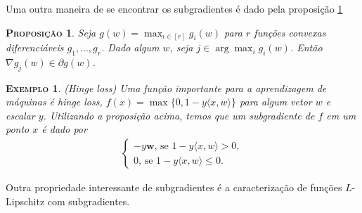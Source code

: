 \documentclass[
	12pt,				%
    oneside,			%
	a4paper,			%
	english,			%
	french,				%
	spanish,			%
	brazil,				%
	]{abntex2}
\newtheorem{propo}[theorem]{\scshape Proposi\c{c}\~ao}
\newtheorem{ex}{\scshape Exemplo}[section]
\begin{document}
            Uma outra maneira de se encontrar os subgradientes é dado pela proposição \ref{prop:subconv}

            \begin{propo}\label{prop:subconv}
                Seja $g(w) = \max_{i \in [r]} g_i(w)$ para $r$ funções convexas diferenciáveis $g_1,...,g_r$. Dado algum $w$, seja $j \in \arg\max_i g_i(w)$. Então $\nabla g_j(w) \in \partial g(w)$.
            \end{propo}


            \begin{ex}{\emph{(Hinge loss)}}
                Uma função importante para a aprendizagem de máquinas é \emph{hinge loss}, $f(x) = \max\{0, 1-y\langle x, w \rangle\}$ para algum vetor $w$ e escalar $y$. Utilizando a proposição acima, temos que um subgradiente de $f$ em um ponto $x$ é dado por
                \begin{gather*}
                    \left \{
                    \begin{split}
                        -y\textbf{w}\mbox{, se } 1-y\langle x, w \rangle > 0, \\
                        0\mbox{, se } 1-y\langle x, w \rangle \leq 0.
                    \end{split}
                    \right.
                \end{gather*}
            \end{ex}

            Outra propriedade interessante de subgradientes é a caracterização de funções $L$-Lipschitz com subgradientes.
\end{document}
